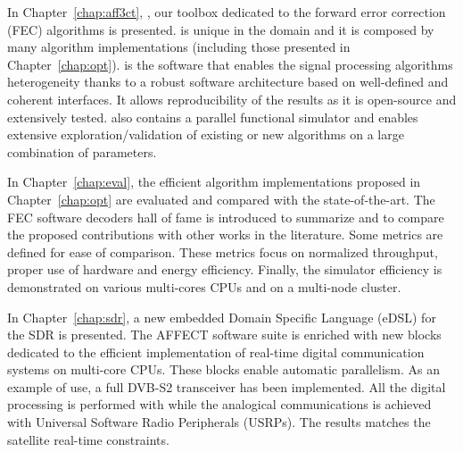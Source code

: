 In Chapter~\ref{chap:aff3ct}, \AFFECT, our toolbox dedicated to the forward
error correction (FEC) algorithms is presented. \AFFECT is unique in the domain
and it is composed by many algorithm implementations (including those presented
in Chapter~\ref{chap:opt}). \AFFECT is the software that enables the signal
processing algorithms heterogeneity thanks to a robust software architecture
based on well-defined and coherent interfaces. It allows reproducibility of the
results as it is open-source and extensively tested. \AFFECT also contains a
parallel functional simulator and enables extensive exploration/validation of
existing or new algorithms on a large combination of parameters.

In Chapter~\ref{chap:eval}, the efficient algorithm implementations proposed
in Chapter~\ref{chap:opt} are evaluated and compared with the state-of-the-art.
The FEC software decoders hall of fame is introduced to summarize and to compare
the proposed contributions with other works in the literature. Some metrics are
defined for ease of comparison. These metrics focus on normalized throughput,
proper use of hardware and energy efficiency. Finally, the \AFFECT simulator
efficiency is demonstrated on various multi-cores CPUs and on a multi-node
cluster.

In Chapter~\ref{chap:sdr}, a new embedded Domain Specific Language (eDSL) for
the SDR is presented. The AFFECT software suite is enriched with new blocks
dedicated to the efficient implementation of real-time digital communication
systems on multi-core CPUs. These blocks enable automatic parallelism. As an
example of use, a full DVB-S2 transceiver has been implemented. All the digital
processing is performed with \AFFECT while the analogical communications is
achieved with Universal Software Radio Peripherals (USRPs). The results matches
the satellite real-time constraints.
